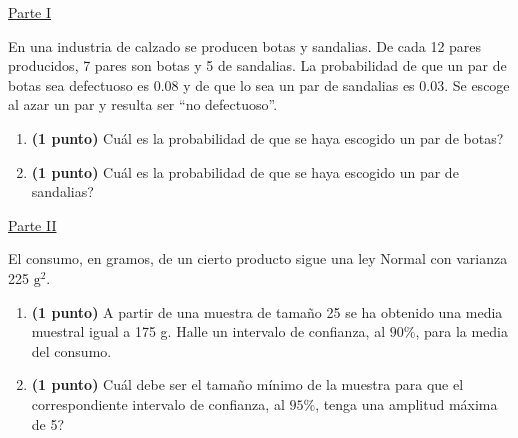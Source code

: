 
\noindent\underline{Parte I}

En una industria de calzado se producen botas y sandalias. De cada 12 pares producidos, 7 pares son botas y 5 de sandalias. La probabilidad de que un par de botas sea defectuoso es $0.08$ y de que lo sea un par de sandalias es $0.03$. Se escoge al azar un par y resulta ser ``no defectuoso''.
\begin{enumerate}[label=\alph*)]
\item \textbf{(1 punto)} \textquestiondown{}Cuál es la probabilidad de que se haya escogido un par de botas?
\item \textbf{(1 punto)} \textquestiondown{}Cuál es la probabilidad de que se haya escogido un par de sandalias?
\end{enumerate}
\par\noindent\begin{minipage}{\linewidth}
\noindent\underline{Parte II}

El consumo, en gramos, de un cierto producto sigue una ley Normal con varianza 225 $\mathrm{g}^2$.
\begin{enumerate}[label=\alph*)]
\item \textbf{(1 punto)} A partir de una muestra de tamaño 25 se ha obtenido una media muestral igual a 175 g. Halle un intervalo de confianza, al $90\%$, para la media del consumo.
\item \textbf{(1 punto)} \textquestiondown{}Cuál debe ser el tamaño mínimo de la muestra para que el correspondiente intervalo de confianza, al $95\%$, tenga una amplitud máxima de 5?
\end{enumerate}
\end{minipage}\par
